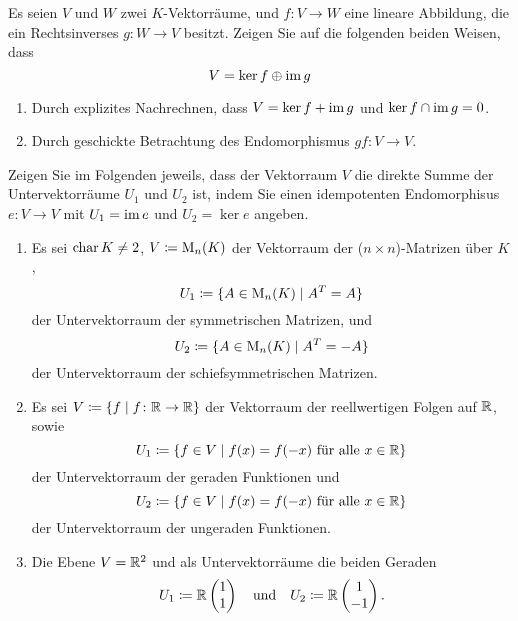 \begin{question}
  Es seien $V$ und $W$ zwei $K$-Vektorräume, und $f \colon V \to W$ eine lineare Abbildung, die ein Rechtsinverses $g \colon W \to V$ besitzt.
  Zeigen Sie auf die folgenden beiden Weisen, dass
  \[
    V = \ker f \oplus \operatorname{im} g
  \]
  \begin{enumerate}[leftmargin=*]
    \item
      Durch explizites Nachrechnen, dass $V = \ker f + \operatorname{im} g$ und $\ker f \cap \operatorname{im} g = 0$.
    \item
      Durch geschickte Betrachtung des Endomorphismus $gf \colon V \to V$.
  \end{enumerate}
\end{question}


\begin{question}
  Zeigen Sie im Folgenden jeweils, dass der Vektorraum $V$ die direkte Summe der Untervektorräume $U_1$ und $U_2$ ist, indem Sie einen idempotenten Endomorphisus $e \colon V \to V$ mit $U_1 = \operatorname{im} e$ und $U_2 = \ker e$ angeben.
  \begin{enumerate}[leftmargin=*]
    \item
      Es sei $\operatorname{char} K \neq 2$, $V \coloneqq \operatorname{M}_n(K)$ der Vektorraum der ($n \times n$)-Matrizen über $K$,
      \[
        U_1 \coloneqq \{ A \in \operatorname{M}_n(K) \mid A^T = A \}
      \]
      der Untervektorraum der symmetrischen Matrizen, und
      \[
        U_2 \coloneqq \{ A \in \operatorname{M}_n(K) \mid A^T = -A \}
      \]
      der Untervektorraum der schiefsymmetrischen Matrizen.
    \item
      Es sei $V \coloneqq \{ f \mid f \colon \mathbb{R} \to \mathbb{R} \}$ der Vektorraum der reellwertigen Folgen auf $\mathbb{R}$, sowie
      \[
        U_1 \coloneqq \{ f \in V \mid \text{$f(x) = f(-x)$ für alle $x \in \mathbb{R}$} \}
      \]
      der Untervektorraum der geraden Funktionen und
      \[
        U_2 \coloneqq \{ f \in V \mid \text{$f(x) = f(-x)$ für alle $x \in \mathbb{R}$} \}
      \]
      der Untervektorraum der ungeraden Funktionen.
    \item
      Die Ebene $V = \mathbb{R}^2$ und als Untervektorräume die beiden Geraden
      \[
        U_1 \coloneqq \mathbb{R} \begin{pmatrix} 1 \\  1 \end{pmatrix}
        \quad\text{und}\quad
        U_2 \coloneqq \mathbb{R} \begin{pmatrix} 1 \\ -1 \end{pmatrix}.
      \]

\end{enumerate}
\end{question}
